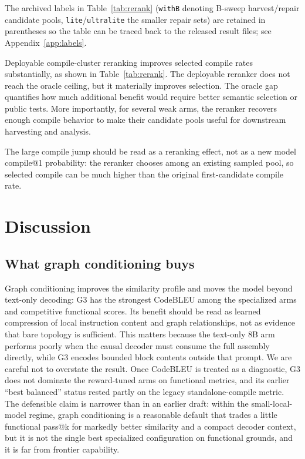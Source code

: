 \documentclass[11pt]{article}
\begin{document}
The archived labels in Table~\ref{tab:rerank} (\texttt{withB} denoting B-sweep harvest/repair candidate pools, \texttt{lite}/\texttt{ultralite} the smaller repair sets) are retained in parentheses so the table can be traced back to the released result files; see Appendix~\ref{app:labels}.

Deployable compile-cluster reranking improves selected compile rates substantially, as shown in Table~\ref{tab:rerank}. The deployable reranker does not reach the oracle ceiling, but it materially improves selection. The oracle gap quantifies how much additional benefit would require better semantic selection or public tests. More importantly, for several weak arms, the reranker recovers enough compile behavior to make their candidate pools useful for downstream harvesting and analysis.

The large compile jump should be read as a reranking effect, not as a new model compile@1 probability: the reranker chooses among an existing sampled pool, so selected compile can be much higher than the original first-candidate compile rate.

\section{Discussion}

\subsection{What graph conditioning buys}

Graph conditioning improves the similarity profile and moves the model beyond text-only decoding: G3 has the strongest CodeBLEU among the specialized arms and competitive functional scores. Its benefit should be read as learned compression of local instruction content and graph relationships, not as evidence that bare topology is sufficient. This matters because the text-only 8B arm performs poorly when the causal decoder must consume the full assembly directly, while G3 encodes bounded block contents outside that prompt. We are careful not to overstate the result. Once CodeBLEU is treated as a diagnostic, G3 does not dominate the reward-tuned arms on functional metrics, and its earlier ``best balanced'' status rested partly on the legacy standalone-compile metric. The defensible claim is narrower than in an earlier draft: within the small-local-model regime, graph conditioning is a reasonable default that trades a little functional pass@k for markedly better similarity and a compact decoder context, but it is not the single best specialized configuration on functional grounds, and it is far from frontier capability.
\end{document}
